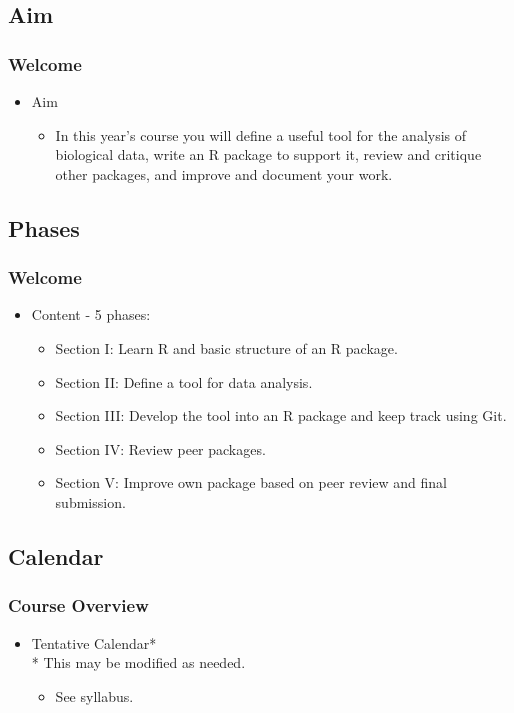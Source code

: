 \documentclass[11pt]{beamer}
\begin{document}
\subsection{Aim}
\begin{frame}
\frametitle{Welcome}
\begin{itemize}
\item Aim
\vspace{0.2in}
\begin{itemize}
\item In this year's course you will define a useful tool for the analysis of biological data, write an R package to support it, review and critique other packages, and improve and document your work.
\end{itemize}
\end{itemize}
\end{frame}

\subsection{Phases}
\begin{frame}
\frametitle{Welcome}
\begin{itemize}
\item Content - 5 phases:
\vspace{0.2in}
\begin{itemize}
\item Section I:  Learn {\sf R} and basic structure of  an {\sf R} package. 
\vspace{0.1in}
\item Section II: Define a tool for data analysis.
\vspace{0.1in}
\item Section III: Develop the tool into an  {\sf R} package and keep track using Git. 
\vspace{0.1in}
\item Section IV: Review peer packages.
\vspace{0.1in}
\item Section V: Improve own package based on peer review and final submission.
\end{itemize}
\end{itemize}
\end{frame}

\subsection{Calendar}
\begin{frame}
\frametitle{Course Overview}
\begin{itemize}
\item Tentative Calendar* \\
\vspace{0.2in}
* This may be modified as needed. \\
\vspace{0.2in}
\begin{itemize}
\item See syllabus.
\end{itemize}
\end{itemize}
\end{frame}
\end{document}
